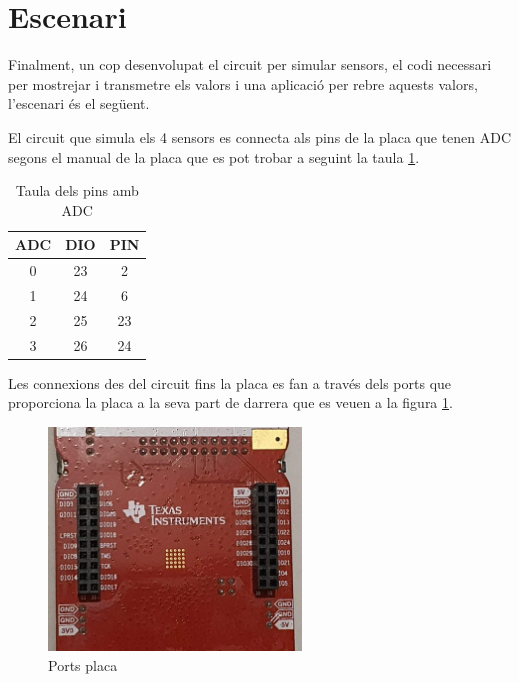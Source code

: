 \section{Escenari}
Finalment, un cop desenvolupat el circuit per simular sensors, el codi necessari per mostrejar i transmetre els valors i una aplicació per rebre aquests valors, l'escenari és el següent.

El circuit que simula els 4 sensors es connecta als pins de la placa que tenen ADC segons el manual de la placa que es pot trobar a \cite{manual_placa} seguint la taula \ref{connexions}.

\begin{table}[!h]
	\begin{center}
		\begin{tabular}{|c|c|c|}
			\hline
			ADC			&	DIO		& 	PIN		\\	\hline
			0			&	23		&	2		\\	\hline
			1			&	24		&	6		\\	\hline
			2			&	25		&	23		\\	\hline
			3			&	26		&	24		\\	\hline
		\end{tabular}
	\end{center}
	\caption{Taula dels pins amb ADC}
	\label{connexions}
\end{table}

Les connexions des del circuit fins la placa es fan a través dels ports que proporciona la placa a la seva part de darrera que es veuen a la figura \ref{ports_placa}.

\begin{figure}
	\begin{center}
		\includegraphics[angle=90, width=0.6\textwidth]{./images/connexions_placa.jpg}
		\caption{Ports placa}
		\label{ports_placa}
	\end{center}
\end{figure}


